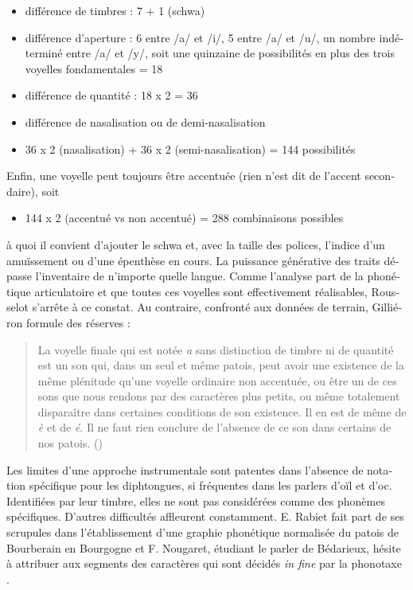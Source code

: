 \documentclass[output=paper]{../langscibook}
\begin{document}
\begin{otherlanguage}{french}
\begin{itemize}
    \item différence de timbres : 7 + 1 (schwa)
    \item différence d’aperture : 6 entre /a/ et /i/, 5 entre /a/ et /u/, un nombre indéterminé entre /a/ et /y/, soit une quinzaine de possibilités en plus des trois voyelles fondamentales = 18
    \item différence de quantité : 18 x 2 = 36
    \item différence de nasalisation ou de demi-nasalisation
    \item 36 x 2 (nasalisation) + 36 x 2 (semi-nasalisation) = 144 possibilités
\end{itemize}

Enfin, une voyelle peut toujours être accentuée (rien n’est dit de l’accent secondaire), soit

\begin{itemize}
      \item 144 x 2 (accentué vs non accentué) = 288 combinaisons possibles 
\end{itemize}

à quoi il convient d’ajouter le schwa et, avec la taille des polices, l’indice d’un amuïssement ou d’une épenthèse en cours. La puissance générative des traits dépasse l’inventaire de n’importe quelle langue. Comme l’analyse part de la phonétique articulatoire et que toutes ces voyelles sont effectivement réalisables, Rousselot s’arrête à ce constat. Au contraire, confronté aux données de terrain, Gilliéron formule des réserves :

\begin{quote}
    La voyelle finale qui est notée \textit{a} sans distinction de timbre ni de quantité est un son qui, dans un seul et même patois, peut avoir une existence de la même plénitude qu’une voyelle ordinaire non accentuée, ou être un de ces sons que nous rendons par des caractères plus petits, ou même totalement disparaître dans certaines conditions de son existence. Il en est de même de \textit{è} et de \textit{é}. Il ne faut rien conclure de l’absence de ce son dans certains de nos patois. (\citealt[33--34n]{gillieron_melanges_1888})
\end{quote}

Les limites d’une approche instrumentale sont patentes dans l’absence de notation spécifique pour les diphtongues, si fréquentes dans les parlers d’oïl et d’oc. Identifiées par leur timbre, elles ne sont pas considérées comme des phonèmes spécifiques. D’autres difficultés affleurent constamment. E. Rabiet fait part de ses scrupules dans l’établissement d’une graphie phonétique normalisée du patois de Bourberain en Bourgogne \citeyear[243]{rabiet_patois_1887} et F. Nougaret, étudiant le parler de Bédarieux, hésite à attribuer aux segments des caractères qui sont décidés \textit{in fine} par la phonotaxe \citeyear[216]{nougaret_patois_1890}.


\end{otherlanguage}
\end{document}
